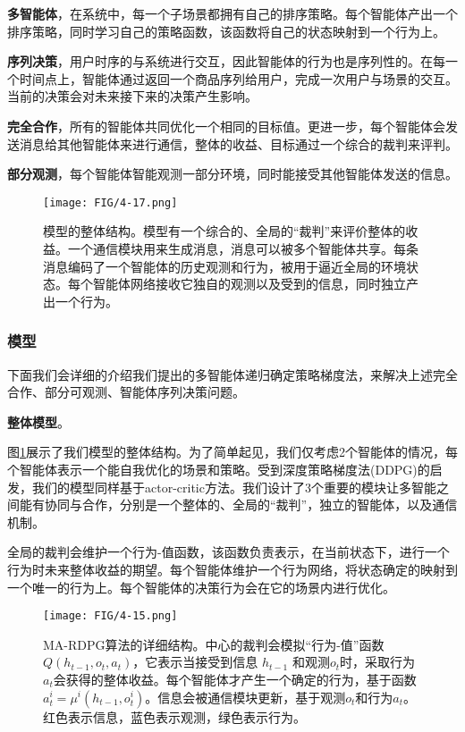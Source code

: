 \textbf{多智能体}，在系统中，每一个子场景都拥有自己的排序策略。每个智能体产出一个排序策略，同时学习自己的策略函数，该函数将自己的状态映射到一个行为上。

\textbf{序列决策}，用户时序的与系统进行交互，因此智能体的行为也是序列性的。在每一个时间点上，智能体通过返回一个商品序列给用户，完成一次用户与场景的交互。当前的决策会对未来接下来的决策产生影响。


\textbf{完全合作}，所有的智能体共同优化一个相同的目标值。更进一步，每个智能体会发送消息给其他智能体来进行通信，整体的收益、目标通过一个综合的裁判来评判。

\textbf{部分观测}，每个智能体智能观测一部分环境，同时能接受其他智能体发送的信息。

\begin{figure}[t]
 \centering
 \texttt{[image: FIG/4-17.png]}
 \caption{模型的整体结构。模型有一个综合的、全局的“裁判”来评价整体的收益。一个通信模块用来生成消息，消息可以被多个智能体共享。每条消息编码了一个智能体的历史观测和行为，被用于逼近全局的环境状态。每个智能体网络接收它独自的观测以及受到的信息，同时独立产出一个行为。}
 \label{fig:framework}
\end{figure}

\subsubsection{模型}
下面我们会详细的介绍我们提出的多智能体递归确定策略梯度法，来解决上述完全合作、部分可观测、智能体序列决策问题。

\textbf{整体模型}。

图\ref{fig:framework}展示了我们模型的整体结构。为了简单起见，我们仅考虑2个智能体的情况，每个智能体表示一个能自我优化的场景和策略。受到深度策略梯度法(DDPG)的启发，我们的模型同样基于actor-critic方法。我们设计了3个重要的模块让多智能之间能有协同与合作，分别是一个整体的、全局的“裁判”，独立的智能体，以及通信机制。

全局的裁判会维护一个行为-值函数，该函数负责表示，在当前状态下，进行一个行为时未来整体收益的期望。每个智能体维护一个行为网络，将状态确定的映射到一个唯一的行为上。每个智能体的决策行为会在它的场景内进行优化。

\begin{figure}[t]
 \centering
 \texttt{[image: FIG/4-15.png]}
 \caption{MA-RDPG算法的详细结构。中心的裁判会模拟“行为-值”函数$Q(h_{t-1},o_t,a_t)$，它表示当接受到信息
$h_{t-1}$ 和观测$o_t$时，采取行为$a_t$会获得的整体收益。每个智能体才产生一个确定的行为，基于函数$a^i_t=\mu^i(h_{t-1},o^i_t)$。信息会被通信模块更新，基于观测$o_t$和行为$a_t$。红色表示信息，蓝色表示观测，绿色表示行为。}
 \label{fig:model}
\end{figure}

